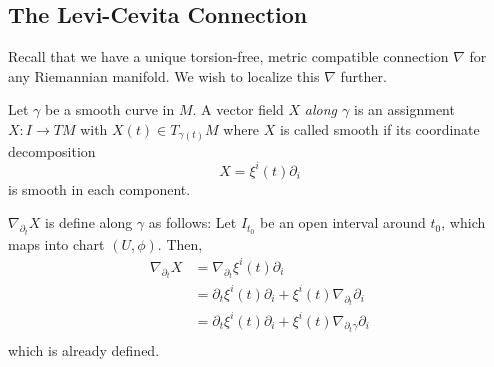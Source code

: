 \documentclass[../main.tex]{subfiles}
\begin{document}
\subsection{The Levi-Cevita Connection}
Recall that we have a unique torsion-free, metric compatible connection $\nabla$
for any Riemannian manifold. We wish to localize this $\nabla$ further.

\begin{def}
    Let $\gamma$ be a smooth curve in $M$. A vector field $X$ {\em along
    $\gamma$} is an assignment $X:I\to TM$ with $X(t) \in T_{\gamma(t)}M$ where
    $X$ is called smooth if its coordinate decomposition
    \[
        X = \xi^i(t)\partial_i
    \]
    is smooth in each component.
\end{def}

\begin{def}
    $\nabla_{\partial_t}X$ is define along $\gamma$ as follows: Let $I_{t_0}$ be an open
    interval around $t_0$, which maps into chart $(U,\phi)$. Then,
    \[
        \begin{aligned}
            \nabla_{\partial_t}X &= \nabla_{\partial_t}\xi^i(t)\partial_i\\
                        &= \partial_t\xi^i(t)\partial_i +
                        \xi^i(t)\nabla_{\partial_t}\partial_i\\
                        &= \partial_t\xi^i(t)\partial_i +
                        \xi^i(t)\nabla_{\partial_t\gamma}\partial_i\\
        \end{aligned}
    \]
    which is already defined.
\end{def}
\end{document}
